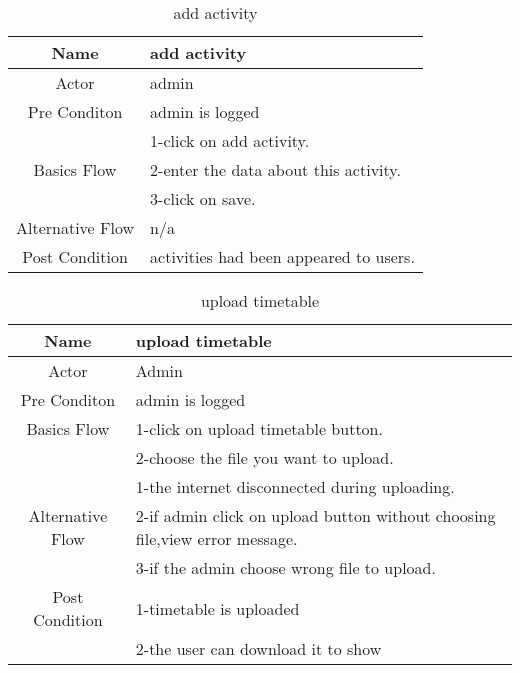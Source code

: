 \documentclass{article}
\begin{document}
	\begin{table}[!h]
		\caption{add activity}
		\centering
		\label{dadd activity}
		\begin{tabular}{|c|l|}
			\hline
			Name             &add activity\\
			\hline
			Actor            &admin\\
			\hline
			Pre Conditon     &admin is logged\\
			\hline
			                 &1-click on add activity.\\
			Basics Flow      &2-enter the data about this activity.\\
			                 &3-click on save.\\
			\hline
			Alternative Flow &n/a\\
			\hline
			Post Condition   &activities had been appeared to users.\\
			\hline
		\end{tabular}
	\end{table}
	
	\begin{table}[!h]
		\caption{upload timetable}
		\centering
		\label{upload timetable}
		\begin{tabular}{|c|l|}
			\hline
			Name             &upload timetable\\
			\hline
			Actor            &Admin \\
			\hline
			Pre Conditon     &admin is logged \\
			\hline
			
			Basics Flow      &1-click on upload timetable button.\\
			&2-choose the file you want to upload.\\
			
			\hline
			                 &1-the internet disconnected during uploading.\\
			Alternative Flow &2-if admin click on upload button without choosing file,view error message.\\
			                 &3-if the admin choose wrong file to upload.\\
			\hline
			Post Condition   &1-timetable is uploaded \\& 2-the user can download it to show\\
			\hline
		\end{tabular}
	\end{table}	
	
	
	
\end{document}
